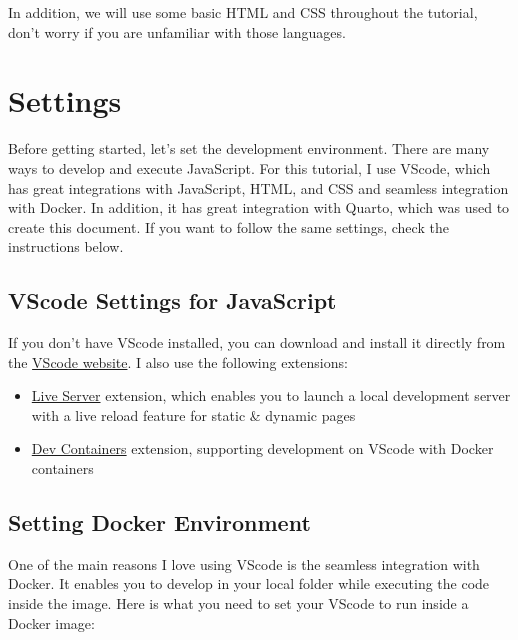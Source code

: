 \documentclass[
  letterpaper,
  DIV=11,
  numbers=noendperiod]{scrreprt}
\providecommand{\tightlist}{%
  \setlength{\itemsep}{0pt}\setlength{\parskip}{0pt}}\usepackage{longtable,booktabs,array}
\begin{document}
In addition, we will use some basic HTML and CSS throughout the
tutorial, don't worry if you are unfamiliar with those languages.

\hypertarget{settings}{%
\section{Settings}\label{settings}}

Before getting started, let's set the development environment. There are
many ways to develop and execute JavaScript. For this tutorial, I use
VScode, which has great integrations with JavaScript, HTML, and CSS and
seamless integration with Docker. In addition, it has great integration
with Quarto, which was used to create this document. If you want to
follow the same settings, check the instructions below.

\hypertarget{vscode-settings-for-javascript}{%
\subsection{VScode Settings for
JavaScript}\label{vscode-settings-for-javascript}}

If you don't have VScode installed, you can download and install it
directly from the \href{https://code.visualstudio.com/}{VScode website}.
I also use the following extensions:

\begin{itemize}
\tightlist
\item
  \href{https://marketplace.visualstudio.com/items?itemName=ritwickdey.LiveServer}{Live
  Server} extension, which enables you to launch a local development
  server with a live reload feature for static \& dynamic pages
\item
  \href{https://marketplace.visualstudio.com/items?itemName=ms-vscode-remote.remote-containers}{Dev
  Containers} extension, supporting development on VScode with Docker
  containers
\end{itemize}

\hypertarget{setting-docker-environment}{%
\subsection{Setting Docker
Environment}\label{setting-docker-environment}}

One of the main reasons I love using VScode is the seamless integration
with Docker. It enables you to develop in your local folder while
executing the code inside the image. Here is what you need to set your
VScode to run inside a Docker image:
\end{document}
